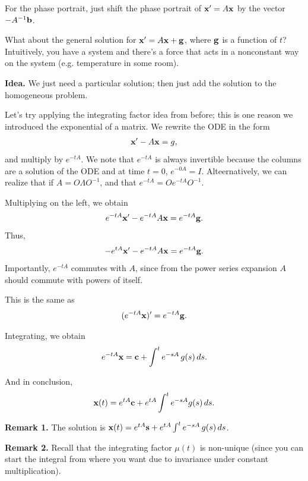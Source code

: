 \documentclass{article}
\begin{document}
For the phase portrait, just shift the phase portrait of $\mathbf{x}' = A \mathbf{x}$ by the vector $- A^{-1} \mathbf{b}$.

What about the general solution for $\mathbf{x}' = A \mathbf{x} + \mathbf{g}$, where $\mathbf{g}$ is a function of $t$? Intuitively, you have a system and there's a force that acts in a nonconstant way on the system (e.g. temperature in some room).

{\bf Idea.} We just need a particular solution; then just add the solution to the homogeneous problem.

Let's try applying the integrating factor idea from before; this is one reason we introduced the exponential of a matrix.  We rewrite the ODE in the form
\begin{align*}
  \mathbf{x}' - A \mathbf{x} = g,
\end{align*}
and multiply by $e^{-tA}$.  We note that $e^{-tA}$ is always invertible because the columns are a solution of the ODE and at time $t = 0$, $e^{-0A} = I$.  Alteernatively, we can realize that if $A = O \Lambda O^{-1}$, and that $e^{-tA} = O e^{-tA} O^{-1}$.

Multiplying on the left, we obtain
\begin{align*}
  e^{-tA} \mathbf{x}' - e^{-tA} A \mathbf{x} = e^{-tA} \mathbf{g}.
\end{align*}
Thus,
\begin{align*}
  - e^{tA} \mathbf{x} ' - e^{-tA} A \mathbf{x} = e^{-tA} \mathbf{g}.
\end{align*}
Importantly, $e^{-tA}$ commutes with $A$, since from the power series expansion $A$ should commute with powers of itself.

This is the same as
\begin{align*}
  (e^{-tA} \mathbf{x})'  = e^{-tA} \mathbf{g}.
\end{align*}

Integrating, we obtain
\begin{align*}
  e^{-tA} \mathbf{x} = \mathbf{c} + \int^{t} e^{-sA} \, g(s) \, ds.
\end{align*}

And in conclusion,
\begin{align*}
  \mathbf{x}(t) = e^{tA} \mathbf{c} + e^{tA} \int^{t} e^{-sA} g(s) \, ds.
\end{align*}

{\bf Remark 1.} The solution is $\mathbf{x}(t) = e^{tA} \mathbf{s} + e^{tA} \int^{t} e^{-sA} \, g(s) \, ds$.

{\bf Remark 2.} Recall that the integrating factor $\mu(t)$ is non-unique (since you can start the integral from where you want due to invariance under constant multiplication).
\end{document}
